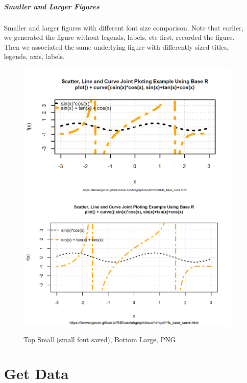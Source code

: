 \documentclass[
]{book}
\begin{document}
\hypertarget{smaller-and-larger-figures}{%
\paragraph{Smaller and Larger Figures}\label{smaller-and-larger-figures}}

Smaller and larger figures with different font size comparison. Note that earlier, we generated the figure without legends, labels, etc first, recorded the figure. Then we associated the same underlying figure with differently sized titles, legends, axis, labels.

\begin{figure}
\centering
\caption{Top Small (small font saved), Bottom Large, PNG}
\includegraphics[width=\linewidth]{_img/fs_img_io_2curve_w80h48_res300.png}
\hfill
\centering
\includegraphics[width=\linewidth]{_img/fs_img_io_2curve_w160h100_res300.png}
\end{figure}

\hypertarget{get-data}{%
\chapter{Get Data}\label{get-data}}
\end{document}

